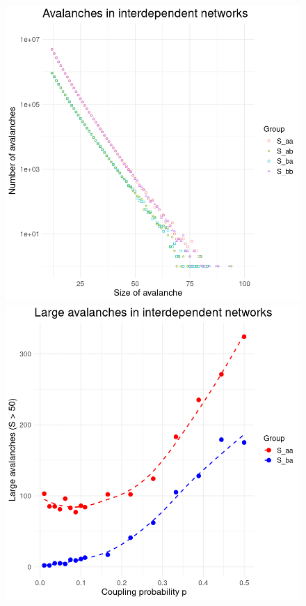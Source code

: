 \begin{figure}[h]
    \centering
    \begin{minipage}{0.5\textwidth}
        \centering
        \includegraphics[width=\textwidth]{images/task15/coupled2.png}
    \end{minipage}\hfill
    \begin{minipage}{0.5\textwidth}
        \centering
        \includegraphics[width=\textwidth]{images/task15/coupled1.png}

\end{minipage}
\end{figure}
